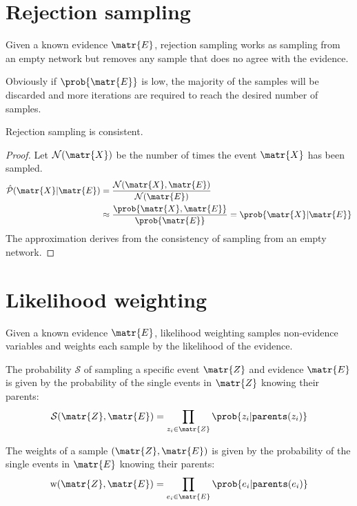 \section{Rejection sampling}

Given a known evidence $\matr{E}$, rejection sampling works as sampling from an empty network
but removes any sample that does no agree with the evidence.

Obviously if $\prob{\matr{E}}$ is low, the majority of the samples will be discarded and 
more iterations are required to reach the desired number of samples.

\begin{theorem}
    Rejection sampling is consistent.

    \begin{proof}
        Let $\mathcal{N}(\matr{X})$ be the number of times the event $\matr{X}$ has been sampled.
        \[
            \begin{split}
                \hat{\mathcal{P}}(\matr{X} | \matr{E}) &= 
                \frac{\mathcal{N}(\matr{X}, \matr{E})}{\mathcal{N}(\matr{E})} \\
                &\approx \frac{\prob{\matr{X}, \matr{E}}}{\prob{\matr{E}}} =
                \prob{\matr{X} | \matr{E}}
            \end{split}    
        \]
        The approximation derives from the consistency of sampling from an empty network.
    \end{proof}
\end{theorem}



\section{Likelihood weighting}

Given a known evidence $\matr{E}$, likelihood weighting samples non-evidence variables and 
weights each sample by the likelihood of the evidence.

The probability $\mathcal{S}$ of sampling a specific event $\matr{Z}$ and evidence $\matr{E}$ is given by the
probability of the single events in $\matr{Z}$ knowing their parents:
\[ \mathcal{S}(\matr{Z}, \matr{E}) = \prod_{z_i \in \matr{Z}} \prob{z_i | \texttt{parents}(z_i)} \]

The weights of a sample $(\matr{Z}, \matr{E})$ is given by the
probability of the single events in $\matr{E}$ knowing their parents:
\[ \text{w}(\matr{Z}, \matr{E}) = \prod_{e_i \in \matr{E}} \prob{e_i | \texttt{parents}(e_i)} \]

